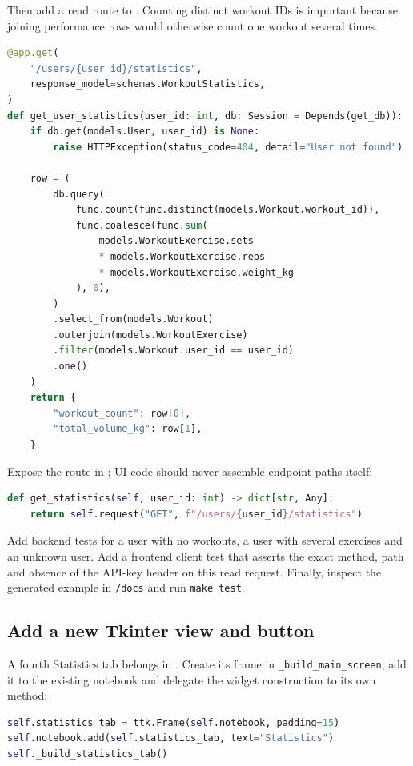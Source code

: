 \documentclass[11pt,a4paper]{article}
\newcommand{\filepath}[1]{\path{#1}}
\begin{document}
Then add a read route to \filepath{main.py}. Counting distinct workout IDs is
important because joining performance rows would otherwise count one workout
several times.

\newpage
\begin{lstlisting}[language=Python,caption={SQLAlchemy aggregate route skeleton}]
@app.get(
    "/users/{user_id}/statistics",
    response_model=schemas.WorkoutStatistics,
)
def get_user_statistics(user_id: int, db: Session = Depends(get_db)):
    if db.get(models.User, user_id) is None:
        raise HTTPException(status_code=404, detail="User not found")

    row = (
        db.query(
            func.count(func.distinct(models.Workout.workout_id)),
            func.coalesce(func.sum(
                models.WorkoutExercise.sets
                * models.WorkoutExercise.reps
                * models.WorkoutExercise.weight_kg
            ), 0),
        )
        .select_from(models.Workout)
        .outerjoin(models.WorkoutExercise)
        .filter(models.Workout.user_id == user_id)
        .one()
    )
    return {
        "workout_count": row[0],
        "total_volume_kg": row[1],
    }
\end{lstlisting}

Expose the route in \filepath{api.py}; UI code should never assemble endpoint
paths itself:

\begin{lstlisting}[language=Python]
def get_statistics(self, user_id: int) -> dict[str, Any]:
    return self.request("GET", f"/users/{user_id}/statistics")
\end{lstlisting}

Add backend tests for a user with no workouts, a user with several exercises
and an unknown user. Add a frontend client test that asserts the exact method,
path and absence of the API-key header on this read request. Finally, inspect
the generated example in \texttt{/docs} and run \texttt{make test}.

\subsection{Add a new Tkinter view and button}

A fourth Statistics tab belongs in \filepath{ui.py}. Create its frame in
\texttt{\_build\_main\_screen}, add it to the existing notebook and delegate
the widget construction to its own method:

\begin{lstlisting}[language=Python,caption={Registering another desktop view}]
self.statistics_tab = ttk.Frame(self.notebook, padding=15)
self.notebook.add(self.statistics_tab, text="Statistics")
self._build_statistics_tab()
\end{lstlisting}
\end{document}
